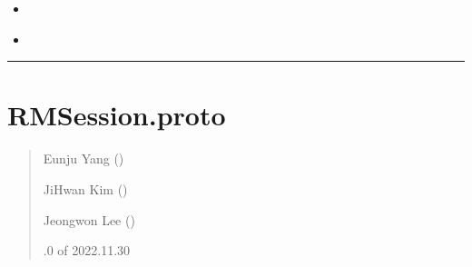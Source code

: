 \documentclass[a4paper,10pt,english]{sphinxmanual}
\begin{document}
\begin{fulllineitems}
\begin{fulllineitems}
\nopagebreak

\begin{itemize}
\item {} 
\sphinxAtStartPar
{\hyperref[\detokenize{_RMSync:RMSync._setRMSyncServer}]{}}

\item {} 
\sphinxAtStartPar
{\hyperref[\detokenize{_RMSync:RMSync.requestRMSession}]{}}

\end{itemize}



\end{fulllineitems}


\end{fulllineitems}



\bigskip\hrule\bigskip


\sphinxstepscope


\section{RMSession.proto}
\label{\detokenize{_RMSessionProto:rmsession-proto}}\label{\detokenize{_RMSessionProto:rmsessionproto}}\label{\detokenize{_RMSessionProto::doc}}\begin{quote}\begin{description}
\begin{DUlineblock}{0em}
\item[] Eunju Yang ()
\item[] JiHwan Kim ()
\item[] Jeongwon Lee ()
\end{DUlineblock}

.0 of 2022.11.30

\end{description}\end{quote}

\sphinxstepscope
\end{document}
